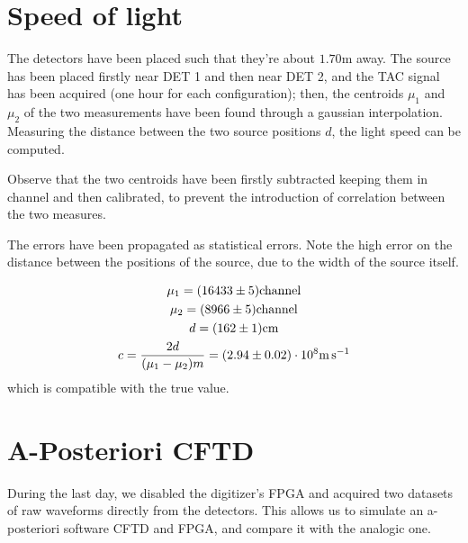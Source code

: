 \documentclass[11pt,a4 paper]{article}
\let\oldfrac\frac
\renewcommand{\frac}[3][d]{\ifthenelse{\equal{#1}{d}}{\oldfrac{#2}{#3}}{\nicefrac{#2}{#3}}}
\begin{document}
\section{Speed of light}
The detectors have been placed such that they're about $1.70\si{\metre}$ away. The  source has been placed firstly near DET 1 and then near DET 2, and the TAC signal has been acquired (one hour for each configuration); then, the centroids $\mu_1$ and $\mu_2$ of the two measurements have been found through a gaussian interpolation. Measuring the distance between the two source positions $d$, the light speed can be computed.

Observe that the two centroids have been firstly subtracted keeping them in channel and then calibrated, to prevent the introduction of correlation between the two measures.

The errors have been propagated as statistical errors. Note the high error on the distance between the positions of the source, due to the width of the source itself.

\begin{gather*}
    \mu_1 = (16433 \pm 5)\si{channel}\\
    \mu_2 = (8966 \pm 5)\si{channel} \\
    d = (162 \pm 1) \si{\centi\metre} \\
    c = \frac{2d}{(\mu_1-\mu_2)m} = (2.94 \pm 0.02 )\cdot 10^8 \si{\metre\per\second}
\end{gather*}
which is compatible with the true value.

\section{A-Posteriori CFTD}
During the last day, we disabled the digitizer's FPGA and acquired two datasets of raw waveforms directly from the detectors. This allows us to simulate an a-posteriori software CFTD and FPGA, and compare it with the analogic one.
\end{document}

